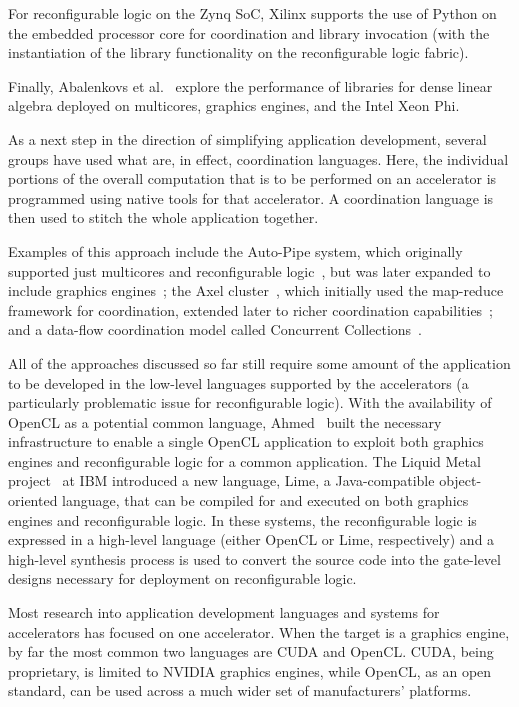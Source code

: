 For reconfigurable logic on the Zynq SoC, Xilinx supports the use of
Python on the embedded processor core for coordination and library
invocation (with the instantiation of the library functionality on the
reconfigurable logic fabric).

Finally, Abalenkovs et al.~\cite{aad+15} explore the performance of
libraries for dense linear algebra deployed on multicores, graphics engines,
and the Intel Xeon Phi.

As a next step in the direction of simplifying application development,
several groups have used what are, in effect, coordination languages.
Here, the individual portions of the overall computation that is to be
performed on an accelerator is programmed using native tools for that
accelerator.  A coordination language is then used to stitch the whole
application together.

Examples of this approach include the Auto-Pipe system, which originally
supported just multicores and reconfigurable logic~\cite{ftb+06}, but was
later expanded to include graphics engines~\cite{cft+10};
the Axel cluster~\cite{tl10}, which initially used the map-reduce
framework for coordination,
extended later to richer coordination capabilities~\cite{ttpl10};
and a data-flow coordination model called Concurrent Collections~\cite{szb+12}.

All of the approaches discussed so far still require some amount of
the application to be developed in the low-level languages supported
by the accelerators (a particularly problematic issue for reconfigurable
logic).
With the availability of OpenCL as a potential common language,
Ahmed~\cite{Ahmed11} built the necessary infrastructure to enable
a single OpenCL application to exploit both graphics engines and
reconfigurable logic for a common application.
The Liquid Metal project~\cite{abb+12} at IBM introduced a new language,
Lime, a Java-compatible object-oriented language, that can be compiled
for and executed on both graphics engines and reconfigurable logic.
In these systems, the reconfigurable logic is expressed in a high-level
language (either OpenCL or Lime, respectively) and a high-level
synthesis process is used to convert the source code into the gate-level
designs necessary for deployment on reconfigurable logic.

Most research into application development languages and systems for
accelerators has focused on one accelerator.  When the target
is a graphics engine, by far the most common two languages are
CUDA and OpenCL. CUDA, being proprietary, is limited to NVIDIA graphics
engines, while OpenCL, as an open standard, can be used across a much
wider set of manufacturers' platforms.

